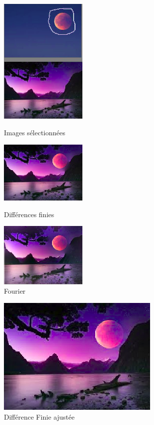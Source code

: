 \begin{figure}[!htb]
   \begin{minipage}{0.33\textwidth}
     \centering
     \includegraphics[width = 120pt]{Images/Resultats/LuneLand.png}
     \caption{Images sélectionnées}
      \end{minipage}\hfill
   \begin{minipage}{0.33\textwidth}
     \centering
     \includegraphics[width = 120pt]{Images/Resultats/LuneDF.png}
     \caption{Différences finies}
      \end{minipage}\hfill
   \begin{minipage}{0.33\textwidth}
     \centering
     \includegraphics[width= 120pt]{Images/Resultats/LuneFourier.png}
     \caption{Fourier}
   \end{minipage}
\end{figure}

\begin{figure}[!h]
\centering
\includegraphics[scale=0.5]{Images/Resultats/LuneDFChangeSel.png}
\caption{Différence Finie ajustée}
\end{figure}

